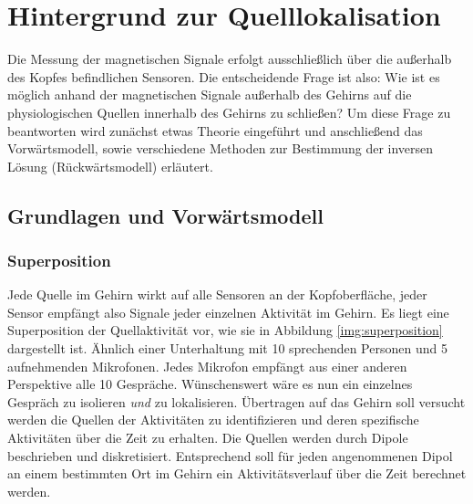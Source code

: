 \documentclass[doc,a4paper,12pt]{apa6}
\begin{document}

\newpage
\section{Hintergrund zur Quelllokalisation}
\label{sec:hinter}

Die Messung der magnetischen Signale erfolgt ausschließlich über die außerhalb des Kopfes befindlichen Sensoren. Die entscheidende Frage ist also: Wie ist es möglich anhand der magnetischen Signale außerhalb des Gehirns auf die physiologischen Quellen innerhalb des Gehirns zu schließen? Um diese Frage zu beantworten wird zunächst etwas Theorie eingeführt und anschließend das Vorwärtsmodell, sowie verschiedene Methoden zur Bestimmung der inversen Lösung (Rückwärtsmodell) erläutert.


\subsection{Grundlagen und Vorwärtsmodell}

\subsubsection{Superposition}

Jede Quelle im Gehirn wirkt auf alle Sensoren an der Kopfoberfläche, jeder Sensor empfängt also Signale jeder einzelnen Aktivität im Gehirn. Es liegt eine Superposition der Quellaktivität vor, wie sie in Abbildung \ref{img:superposition} dargestellt ist. Ähnlich einer Unterhaltung mit 10 sprechenden Personen und 5 aufnehmenden Mikrofonen. Jedes Mikrofon empfängt aus einer anderen Perspektive alle 10 Gespräche. Wünschenswert wäre es nun ein einzelnes Gespräch zu isolieren \emph{und} zu lokalisieren. Übertragen auf das Gehirn soll versucht werden die Quellen der Aktivitäten zu identifizieren und deren spezifische Aktivitäten über die Zeit zu erhalten. Die Quellen werden durch Dipole beschrieben und diskretisiert. Entsprechend soll für jeden angenommenen Dipol an einem bestimmten Ort im Gehirn ein Aktivitätsverlauf über die Zeit berechnet werden.
\end{document}
